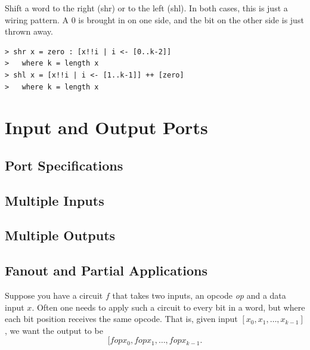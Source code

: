\documentclass[a4paper,openany,fleqn]{book}
\begin{document}
Shift a word to the right (shr) or to the left (shl).  In both
cases, this is just a wiring pattern.  A 0 is brought in on one
side, and the bit on the other side is just thrown away.

\begin{verbatim}
> shr x = zero : [x!!i | i <- [0..k-2]]
>   where k = length x
> shl x = [x!!i | i <- [1..k-1]] ++ [zero]
>   where k = length x
\end{verbatim}

\section{Input and Output Ports}
\label{sec:input-output-ports}

\subsection{Port Specifications}
\label{sec:port-specifications}

\subsection{Multiple Inputs}
\label{sec:multiple-inputs}

\subsection{Multiple Outputs}
\label{sec:multiple-outputs}

\subsection{Fanout and Partial Applications}
\label{sec:fanout-part-appl}

Suppose you have a circuit $f$ that takes two inputs, an opcode
\textit{op} and a data input $x$.  Often one needs to apply such a
circuit to every bit in a word, but where each bit position receives
the same opcode.  That is, given input $[x_0, x_1, \ldots, x_{k-1}]$,
we want the output to be \[[f op x_0, f op x_1, \ldots, f op
x_{k-1}.\]
\end{document}
